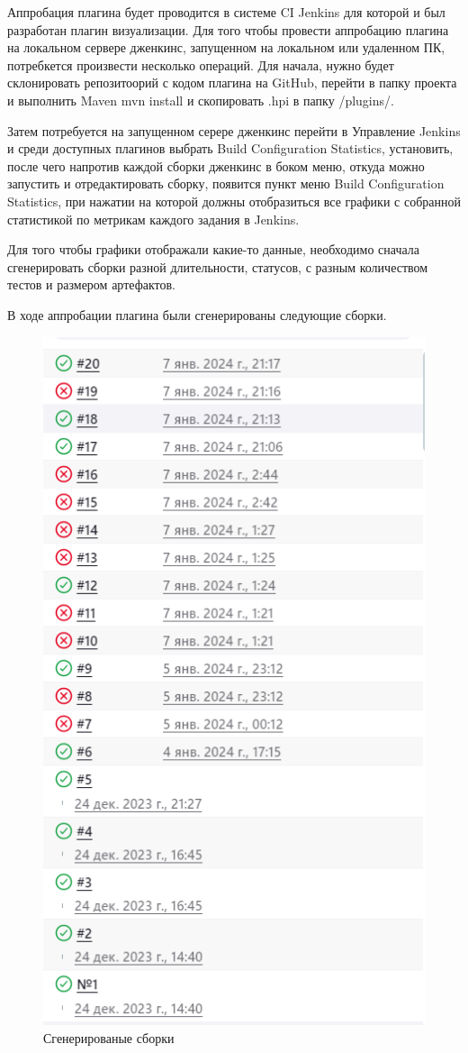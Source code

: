  Аппробация плагина будет проводится в системе CI Jenkins для которой и был разработан плагин визуализации. Для того чтобы провести аппробацию плагина на локальном сервере дженкинс, запущенном на локальном или удаленном ПК, потребкется произвести несколько операций. Для начала, нужно будет склонировать репозитоорий с кодом плагина на GitHub, перейти в папку проекта и выполнить \cite{deployplugin} Maven mvn install и скопировать .hpi в папку /plugins/. 
 
 Затем потребуется на запущенном серере дженкинс перейти в Управление Jenkins  и среди доступных плагинов выбрать Build Configuration Statistics, установить, после чего напротив каждой сборки дженкинс в боком меню, откуда можно запустить и отредактировать сборку, появится пункт меню Build Configuration Statistics, при нажатии на которой должны отобразиться все графики с собранной статистикой по метрикам каждого задания в Jenkins. 
 
 Для того чтобы графики отображали какие-то данные, необходимо сначала сгенерировать сборки разной длительности, статусов, с разным количеством тестов и размером артефактов.
 
 В ходе аппробации плагина были сгенерированы следующие сборки.
 
 \begin{figure}[ht!] 
	\center
	\includegraphics [scale=0.47] {my_folder/images//builds}
	\caption{Сгенерированые сборки} 
	\label{fig:builds}  
\end{figure}


